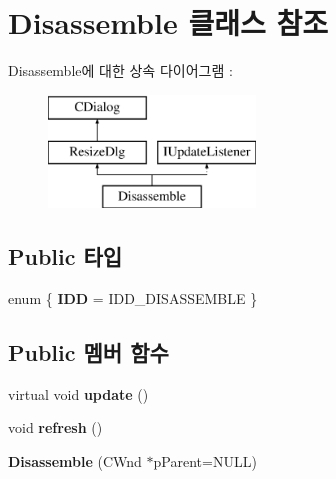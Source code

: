 \hypertarget{class_disassemble}{}\section{Disassemble 클래스 참조}
\label{class_disassemble}
Disassemble에 대한 상속 다이어그램 \+: \begin{figure}[H]
\begin{center}
\leavevmode
\includegraphics[height=3.000000cm]{class_disassemble}
\end{center}
\end{figure}
\subsection*{Public 타입}
\begin{DoxyCompactItemize}
\item 
\mbox{\label{class_disassemble_ad63913a23ece149e6d04f14419966822}} 
enum \{ {\bfseries I\+DD} = I\+D\+D\+\_\+\+D\+I\+S\+A\+S\+S\+E\+M\+B\+LE
 \}
\end{DoxyCompactItemize}
\subsection*{Public 멤버 함수}
\begin{DoxyCompactItemize}
\item 
\mbox{\label{class_disassemble_a30fc26e4204bd886f7cd8eb0c6c22e88}} 
virtual void {\bfseries update} ()
\item 
\mbox{\label{class_disassemble_a7cdf11d53ce0f170ad7dd8fc66961805}} 
void {\bfseries refresh} ()
\item 
\mbox{\label{class_disassemble_ac3db9bf735a8a836c5250bf1d5886fce}} 
{\bfseries Disassemble} (C\+Wnd $\ast$p\+Parent=N\+U\+LL)
\end{DoxyCompactItemize}
